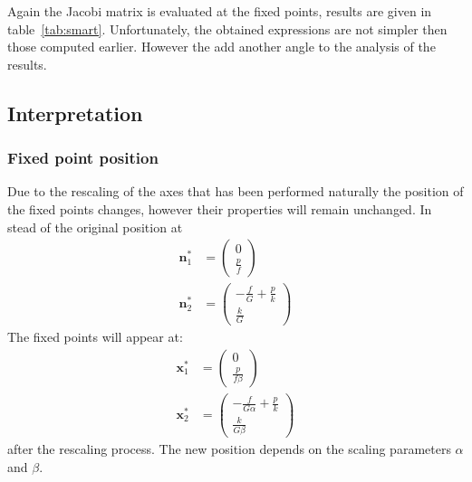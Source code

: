 Again the Jacobi matrix is evaluated at the fixed points, results are given in table~\ref{tab:smart}. Unfortunately, the obtained expressions are not simpler then those computed earlier. However the add another angle to the analysis of the results. 


\subsection{Interpretation}
\subsubsection{Fixed point position}
Due to the rescaling of the axes that has been performed naturally the position of the fixed points changes, however their properties will remain unchanged.
In stead of the original position at
\begin{align}
\mathbf{n}_1^* &= \begin{pmatrix}
0 \\ \frac{p}{f} 
\end{pmatrix} \\
\mathbf{n}_2^* &= \begin{pmatrix}
-\frac{f}{G} + \frac{p}{k} \\
\frac{k}{G}
\end{pmatrix}
\end{align}
The fixed points will appear at:
\begin{align}
\mathbf{x}_1^* &= \begin{pmatrix}
0 \\ \frac{p}{f\beta} 
\end{pmatrix} \\
\mathbf{x}_2^* &= \begin{pmatrix}
-\frac{f}{G\alpha} + \frac{p}{k} \\
\frac{k}{G\beta}
\end{pmatrix}
\end{align}
after the rescaling process. The new position depends on the scaling parameters $\alpha$ and $\beta$.





 

%
%
%




